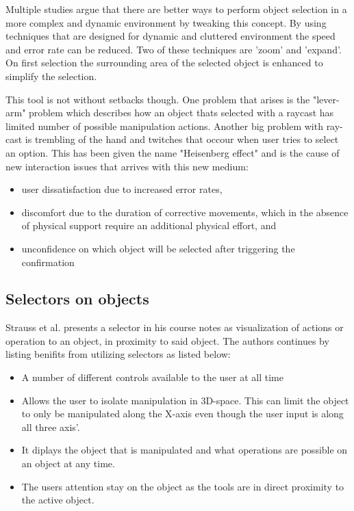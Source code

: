 Multiple studies argue that there are better ways to perform object selection in a more complex and dynamic environment by tweaking this concept.\cite{selection:Argelaguet2008,interactions:Bowman1997} By using techniques that are designed for dynamic and cluttered environment the speed and error rate can be reduced. Two of these techniques are 'zoom' and 'expand'. On first selection the surrounding area of the selected object is enhanced to simplify the selection.

This tool is not without setbacks though. One problem that arises is the "lever-arm" problem which describes how an object thats selected with a raycast has limited number of possible manipulation actions.\cite{interactions:Poupyrev1996} Another big problem with ray-cast is trembling of the hand and twitches that occour when user tries to select an option. This has been given the name "Heisenberg effect" and is the cause of new interaction issues that arrives with this new medium\cite{selection:Bowman2001}:

\begin{itemize}
\item user dissatisfaction due to increased error rates,
\item discomfort due to the duration of corrective movements, which in the absence of physical support require an additional physical effort, and
\item unconfidence on which object will be selected after triggering the confirmation
\end{itemize}

\subsection{Selectors on objects}
\label{theory:toolsandtech:selector}
Strauss et al. presents a selector in his course notes\cite{tools:strauss2002design} as visualization of actions or operation to an object, in proximity to said object. The authors continues by listing benifits from utilizing selectors as listed below:
\begin{itemize}
  \item A number of different controls available to the user at all time
  \item Allows the user to isolate manipulation in 3D-space. This can limit the object to only be manipulated along the X-axis even though the user input is along all three axis'.
  \item It diplays the object that is manipulated and what operations are possible on an object at any time.
  \item The users attention stay on the object as the tools are in direct proximity to the active object.

\end{itemize}
